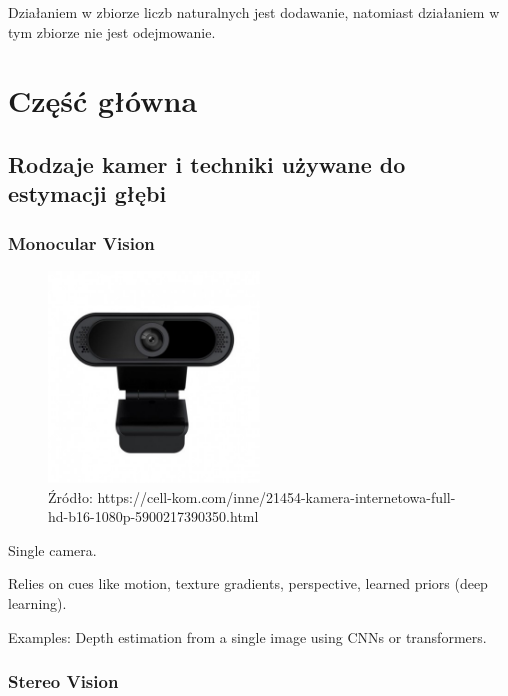 \documentclass[magisterska]{pracadypl}
\begin{document}
  Działaniem w zbiorze liczb naturalnych jest dodawanie, natomiast działaniem w tym zbiorze nie jest odejmowanie.


\chapter{Część główna}

\section{Rodzaje kamer i techniki używane do estymacji głębi}

\subsection{Monocular Vision}

\begin{figure}[h]  %
    \centering  %
    \includegraphics[width=0.5\textwidth]{images/MONO.jpg}  %
    \captionsetup{labelformat=empty, font=footnotesize}
    \caption{Źródło: https://cell-kom.com/inne/21454-kamera-internetowa-full-hd-b16-1080p-5900217390350.html}
    \label{fig:mono}  %
\end{figure}


Single camera.

Relies on cues like motion, texture gradients, perspective, learned priors (deep learning).

Examples: Depth estimation from a single image using CNNs or transformers.

\subsection{Stereo Vision}
\end{document}
